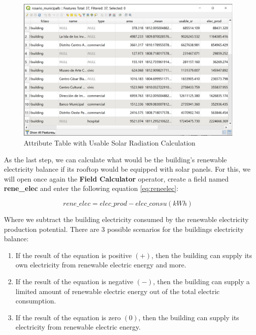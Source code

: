 \documentclass[
]{book}
\providecommand{\tightlist}{%
  \setlength{\itemsep}{0pt}\setlength{\parskip}{0pt}}
\begin{document}
\begin{figure}

{\centering \includegraphics[width=1\linewidth]{images/elecprod} 

}

\caption{Attribute Table with Usable Solar Radiation Calculation}\label{fig:img-195}
\end{figure}

As the last step, we can calculate what would be the building's renewable electricity balance if its rooftop would be equipped with solar panels.
For this, we will open once again the \textbf{Field Calculator} operator, create a field named \textbf{rene\_elec} and enter the following equation \eqref{eq:reneelec}:

\begin{equation}
rene\_elec = elec\_prod - elec\_consu (kWh)
\label{eq:reneelec}
\end{equation}

Where we subtract the building electricity consumed by the renewable electricity production potential. There are 3 possible scenarios for the buildings electricity balance:

\begin{enumerate}
\def\labelenumi{\arabic{enumi}.}
\tightlist
\item
  If the result of the equation is positive \((+)\), then the building can supply its own electricity from renewable electric energy and more.
\item
  If the result of the equation is negative \((-)\), then the building can supply a limited amount of renewable electric energy out of the total electric consumption.
\item
  If the result of the equation is zero \((0)\), then the building can supply its electricity from renewable electric energy.
\end{enumerate}
\end{document}
